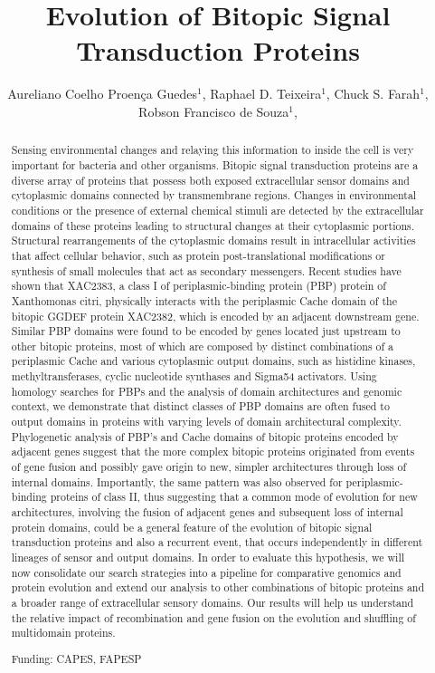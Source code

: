 \documentclass[twoside]{article}
\title{\vspace{-15mm}\fontsize{24pt}{10pt}\selectfont\textbf{ Evolution of Bitopic Signal Transduction Proteins }} %
\author{ Aureliano Coelho Proença Guedes$^{1}$, Raphael D. Teixeira$^{1}$, Chuck S. Farah$^{1}$, Robson Francisco de Souza$^{1}$, }
\affil{ 1 USP

 }
\date{}
\begin{document}
  
  
  \maketitle %
  
  
  \thispagestyle{fancy} %
  
  
  \begin{abstract}
  Sensing environmental changes and relaying this information to inside the cell is very important for bacteria and other organisms. Bitopic signal transduction proteins are a diverse array of proteins that possess both exposed extracellular sensor domains and cytoplasmic domains connected by transmembrane regions. Changes in environmental conditions or the presence of external chemical stimuli are detected by the extracellular domains of these proteins leading to structural changes at their cytoplasmic portions. Structural rearrangements of the cytoplasmic domains result in intracellular activities that affect cellular behavior, such as protein post-translational modifications or synthesis of small molecules that act as secondary messengers. Recent studies have shown that XAC2383, a class I of periplasmic-binding protein (PBP) protein of Xanthomonas citri, physically interacts with the periplasmic Cache domain of the bitopic GGDEF protein XAC2382, which is encoded by an adjacent downstream gene.  Similar PBP domains were found to be encoded by genes located just upstream to other bitopic proteins, most of which are composed by distinct combinations of a periplasmic Cache and various cytoplasmic output domains, such as histidine kinases, methyltransferases, cyclic nucleotide synthases and Sigma54 activators. Using homology searches for PBPs and the analysis of domain architectures and genomic context, we demonstrate that distinct classes of PBP domains are often fused to output domains in proteins with varying levels of domain architectural complexity. Phylogenetic analysis of PBP’s and Cache domains of bitopic proteins encoded by adjacent genes suggest that the more complex bitopic proteins originated from events of gene fusion and possibly gave origin to new, simpler architectures through loss of internal domains. Importantly, the same pattern was also observed for periplasmic-binding proteins of class II, thus suggesting that a common mode of evolution for new architectures, involving the fusion of adjacent genes and subsequent loss of internal protein domains, could be a general feature of the evolution of bitopic signal transduction proteins and also a recurrent event, that occurs independently in different lineages of sensor and output domains. In order to evaluate this hypothesis, we will now consolidate our search strategies into a pipeline for comparative genomics and protein evolution and extend our analysis to other combinations of bitopic proteins and a broader range of extracellular sensory domains. Our results will help us understand the relative impact of recombination and gene fusion on the evolution and shuffling of multidomain proteins.
  
  Funding: CAPES, FAPESP \\ 
  \end{abstract}
  
\end{document}
